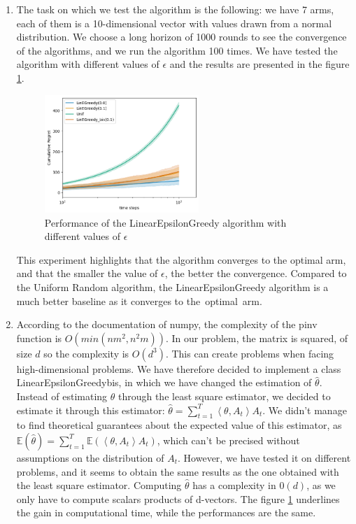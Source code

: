 \begin{enumerate}
        
    \item  The task on which we test the algorithm is the following: we have 7 arms, each of them is a 10-dimensional vector with values drawn from a normal distribution. 
    We choose a long horizon of 1000 rounds to see the convergence of the algorithms, and we run the algorithm 100 times.
    We have tested the algorithm with different values of $\epsilon$ and the results are presented in the figure \ref{fig:lin_epsilon_greedy}.
    \begin{figure}[h]
      \centering
      \includegraphics[width=0.55\textwidth]{images/lin_epsilon_greedy.png}
      \caption{Performance of the LinearEpsilonGreedy algorithm with different values of $\epsilon$}
      \label{fig:lin_epsilon_greedy}
    \end{figure}
    This experiment highlights that the algorithm converges to the optimal arm, and that the smaller the value of $\epsilon$, the better the convergence.
    Compared to the Uniform Random algorithm, the LinearEpsilonGreedy algorithm is a much better baseline as it converges to the optimal arm.
    \item According to the documentation of numpy, the complexity of the pinv function is $O(min(n m^2, n^2m))$. In our problem, the matrix is squared, of size $d$ so the complexity is $O(d^3)$.
This can create problems when facing high-dimensional problems. We have therefore decided to implement a class LinearEpsilonGreedybis, in which we have changed the estimation of $\hat{\theta}$. 
Instead of estimating $\theta$ through the least square estimator, we decided to estimate it through this estimator: $\hat{\theta} = \sum_{t=1}^{T} \left\langle \theta , A_t\right\rangle A_t$. 
We didn't manage to find theoretical guarantees about the expected value of this estimator, as $\mathbb{E}(\hat{\theta}) = \sum_{t=1}^{T} \mathbb{E} ( \left\langle \theta , A_t\right\rangle A_t) $, which can't be precised without assumptions on the distribution of $A_t$.
However, we have tested it on different problems, and it seems to obtain the same results as the one obtained with the least square estimator.
Computing $\hat{\theta}$ has a complexity in $0(d)$, as we only have to compute scalars products of d-vectors. The figure \ref{fig:lin_epsilon_greedy} underlines the gain in computational time, while the performances are the same.


\end{enumerate}
